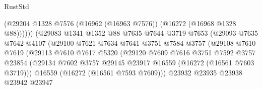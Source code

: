 \begin{lexlean}{RustStd}
\begin{coremodule}
                                        (@29204
                                          @1328
                                          @7576
                                          (@16962 (@16963 @7576))
                                          (@16272 (@16968 @1328 @88))))))
                                  (@29083
                                    @1341
                                    @1352
                                    @88
                                    @7635
                                    @7644
                                    @3719
                                    @7653
                                    (@29093
                                      @7635
                                      @7642
                                      @4107
                                      (@29100
                                        @7621
                                        @7634
                                        @7641
                                        @3751
                                        @7584
                                        @3757
                                        (@29108
                                          @7610
                                          @7619
                                          (@29113
                                            @7610
                                            @7617
                                            @5320
                                            (@29120
                                              @7609
                                              @7616
                                              @3751
                                              @7592
                                              @3757
                                              @23854
                                              (@29134
                                                @7602
                                                @3757
                                                @29145
                                                @23917
                                                @16559
                                                (@16272 (@16561 @7603 @3719)))
                                              @16559
                                              (@16272 (@16561 @7593 @7609)))
                                            @23932
                                            @23935
                                            @23938
                                            @23942
                                            @23947

\end{coremodule}
\end{lexlean}
